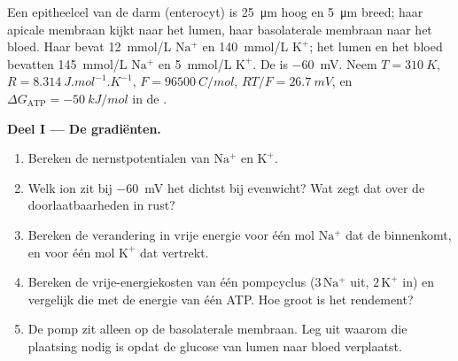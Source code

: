 \begin{problem}
\label{pb:b1:membranes-transport:1}
Een epitheelcel van de darm (enterocyt) is \qty{25}{\micro m} hoog en
\qty{5}{\micro m} breed; haar apicale membraan kijkt naar het lumen, haar
basolaterale membraan naar het bloed. Haar  bevat \qty{12}{mmol/L}
$\mathrm{Na^+}$ en \qty{140}{mmol/L} $\mathrm{K^+}$; het lumen en het bloed
bevatten \qty{145}{mmol/L} $\mathrm{Na^+}$ en \qty{5}{mmol/L} $\mathrm{K^+}$. De
 is \qty{-60}{mV}. Neem $T = \qty{310}{K}$,
$R = \qty{8.314}{J.mol^{-1}.K^{-1}}$, $F = \qty{96500}{C/mol}$,
$RT/F = \qty{26.7}{mV}$, en $\Delta G_{\text{ATP}} = \qty{-50}{kJ/mol}$ in de .

\medskip
\noindent\textbf{Deel I --- De gradiënten.}
\begin{enumerate}
  \item Bereken de nernstpotentialen van $\mathrm{Na^+}$ en
        $\mathrm{K^+}$.
  \item Welk ion zit bij \qty{-60}{mV} het dichtst bij evenwicht? Wat zegt
        dat over de doorlaatbaarheden in rust?
  \item Bereken de verandering in vrije energie voor één mol
        $\mathrm{Na^+}$ dat de  binnenkomt, en voor één mol
        $\mathrm{K^+}$ dat vertrekt.
  \item Bereken de vrije-energiekosten van één pompcyclus
        ($3\,\mathrm{Na^+}$ uit, $2\,\mathrm{K^+}$ in) en vergelijk die
        met de energie van één ATP. Hoe groot is het rendement?
  \item De pomp zit alleen op de basolaterale membraan. Leg uit waarom die
        plaatsing nodig is opdat de  glucose van lumen naar bloed
        verplaatst.
\end{enumerate}


\end{problem}
